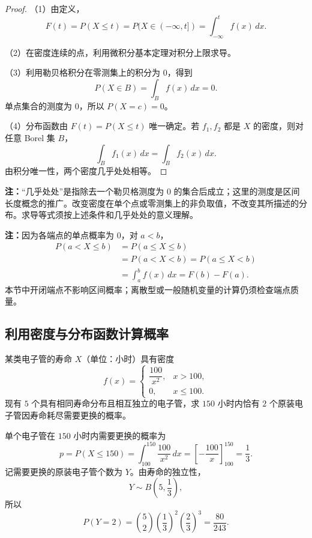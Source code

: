 \begin{proof}
（1）由定义，
\[
F(t)=P(X\leq t)=P(X\in(-\infty,t])
=\int_{-\infty}^t f(x)\,dx.
\]

（2）在密度连续的点，利用微积分基本定理对积分上限求导。

（3）利用勒贝格积分在零测集上的积分为 $0$，得到
\[
P(X\in B)=\int_Bf(x)\,dx=0.
\]
单点集合的测度为 $0$，所以 $P(X=c)=0$。

（4）分布函数由 $F(t)=P(X\leq t)$ 唯一确定。若 $f_1,f_2$ 都是 $X$ 的密度，则对任意 Borel 集 $B$，
\[
\int_Bf_1(x)\,dx=\int_Bf_2(x)\,dx.
\]
由积分唯一性，两个密度几乎处处相等。
\end{proof}

\textbf{注：}\quad “几乎处处”是指除去一个勒贝格测度为 $0$ 的集合后成立；这里的测度是区间长度概念的推广。改变密度在单个点或零测集上的非负取值，不改变其所描述的分布。求导等式须按上述条件和几乎处处的意义理解。

\textbf{注：}\quad 因为各端点的单点概率为 $0$，对 $a<b$，
\[
\begin{aligned}
P(a<X\leq b)&=P(a\leq X\leq b)\\
&=P(a<X<b)=P(a\leq X<b)\\
&=\int_a^b f(x)\,dx=F(b)-F(a).
\end{aligned}
\]
本节中开闭端点不影响区间概率；离散型或一般随机变量的计算仍须检查端点质量。

\subsection*{利用密度与分布函数计算概率}

\begin{example}[五个电子管中恰有两个需要更换]
某类电子管的寿命 $X$（单位：小时）具有密度
\[
f(x)=
\begin{cases}
\dfrac{100}{x^2},&x>100,\\[0.4em]
0,&x\leq100.
\end{cases}
\]
现有 $5$ 个具有相同寿命分布且相互独立的电子管，求 $150$ 小时内恰有 $2$ 个原装电子管因寿命耗尽需要更换的概率。

单个电子管在 $150$ 小时内需要更换的概率为
\[
p=P(X\leq150)
=\int_{100}^{150}\frac{100}{x^2}\,dx
=\left[-\frac{100}{x}\right]_{100}^{150}
=\frac13.
\]
记需要更换的原装电子管个数为 $Y$。由寿命的独立性，
\[
Y\sim B\left(5,\frac13\right),
\]
所以
\[
P(Y=2)=\binom52\left(\frac13\right)^2
\left(\frac23\right)^3=\frac{80}{243}.
\]
\end{example}

